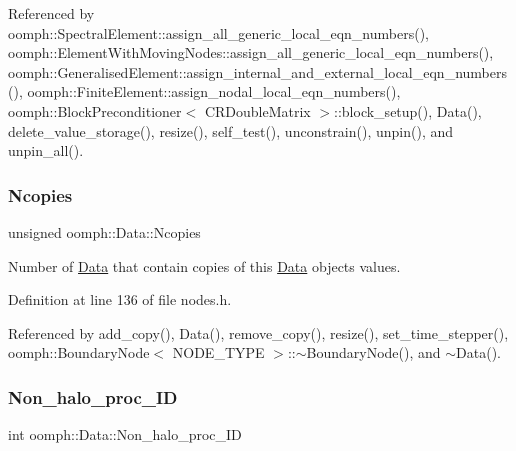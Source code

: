 Referenced by oomph\+::\+Spectral\+Element\+::assign\+\_\+all\+\_\+generic\+\_\+local\+\_\+eqn\+\_\+numbers(), oomph\+::\+Element\+With\+Moving\+Nodes\+::assign\+\_\+all\+\_\+generic\+\_\+local\+\_\+eqn\+\_\+numbers(), oomph\+::\+Generalised\+Element\+::assign\+\_\+internal\+\_\+and\+\_\+external\+\_\+local\+\_\+eqn\+\_\+numbers(), oomph\+::\+Finite\+Element\+::assign\+\_\+nodal\+\_\+local\+\_\+eqn\+\_\+numbers(), oomph\+::\+Block\+Preconditioner$<$ C\+R\+Double\+Matrix $>$\+::block\+\_\+setup(), Data(), delete\+\_\+value\+\_\+storage(), resize(), self\+\_\+test(), unconstrain(), unpin(), and unpin\+\_\+all().

\mbox{\label{classoomph_1_1Data_a7e8dbdf96bf78658e85c1d7f81ff10dd}} 
\subsubsection{\texorpdfstring{Ncopies}{Ncopies}}
{\footnotesize\ttfamily unsigned oomph\+::\+Data\+::\+Ncopies\hspace{0.3cm}{\ttfamily [protected]}}



Number of \hyperlink{classoomph_1_1Data}{Data} that contain copies of this \hyperlink{classoomph_1_1Data}{Data} object\textquotesingle{}s values. 



Definition at line 136 of file nodes.\+h.



Referenced by add\+\_\+copy(), Data(), remove\+\_\+copy(), resize(), set\+\_\+time\+\_\+stepper(), oomph\+::\+Boundary\+Node$<$ N\+O\+D\+E\+\_\+\+T\+Y\+P\+E $>$\+::$\sim$\+Boundary\+Node(), and $\sim$\+Data().

\mbox{\label{classoomph_1_1Data_a5474e601ebda6bde66c179c92831729e}} 
\subsubsection{\texorpdfstring{Non\+\_\+halo\+\_\+proc\+\_\+\+ID}{Non\_halo\_proc\_ID}}
{\footnotesize\ttfamily int oomph\+::\+Data\+::\+Non\+\_\+halo\+\_\+proc\+\_\+\+ID\hspace{0.3cm}{\ttfamily [private]}}



